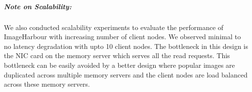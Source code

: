 \subparagraph*{Note on Scalability:} We also conducted scalability experiments to evaluate the performance of ImageHarbour with increasing number of client nodes. We observed minimal to no latency degradation with upto 10 client nodes. The bottleneck in this design is the NIC card on the memory server which serves all the read requests. This bottleneck can be easily avoided by a better design where popular images are duplicated across multiple memory servers and the client nodes are load balanced across these memory servers. 


